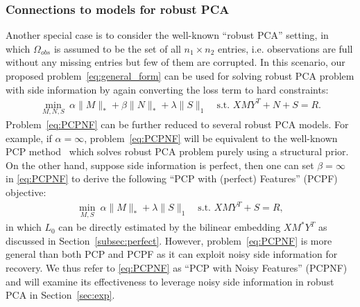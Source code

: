 \documentclass[twoside,11pt]{article}
\def\Obs{\Omega_{obs}}
\def\realL{L_0}
\def\optM{M^*}
\begin{document}
\subsubsection{Connections to models for robust PCA}
Another special case is to consider the well-known ``robust PCA'' setting, in which $\Obs$ is
assumed to be the set of all $n_1\times n_2$ entries, i.e.
observations are full without any missing entries but few of them are corrupted.
In this scenario, our proposed problem~\eqref{eq:general_form} can be used for solving robust PCA problem
with side information by again converting the loss term to hard constraints:
\begin{align}
  \min_{M, N, S} \ \alpha\|M\|_* + \beta\|N\|_* + \lambda\|S\|_1 \quad
  \text{s.t. } XMY^T+N+S = R.
  \label{eq:PCPNF}
\end{align}
Problem~\eqref{eq:PCPNF} can be further reduced to several robust PCA models.  For example,
if $\alpha = \infty$, problem~\eqref{eq:PCPNF} will be equivalent to the well-known
PCP method~\citep{Candes11a} which solves robust PCA problem purely using a structural prior.
On the other hand, suppose side information is perfect, then one can set $\beta = \infty$ in \eqref{eq:PCPNF} to
derive the following ``PCP with (perfect) Features'' (PCPF) objective:
\begin{align}
  \min_{M, S} \ \alpha\|M\|_* + \lambda\|S\|_1 \quad
  \text{s.t. } XMY^T+S = R,
  \label{eq:PCPF}
\end{align}
in which $\realL$ can be directly estimated by the bilinear embedding $X\optM Y^T$
as discussed in Section~\ref{subsec:perfect}.  However,
problem~\eqref{eq:PCPNF} is more general than both PCP and PCPF as it can exploit noisy side information for recovery.
We thus refer to \eqref{eq:PCPNF} as ``PCP with Noisy Features'' (PCPNF) and will examine its effectiveness to leverage
noisy side information in robust PCA in Section~\ref{sec:exp}.
\end{document}
